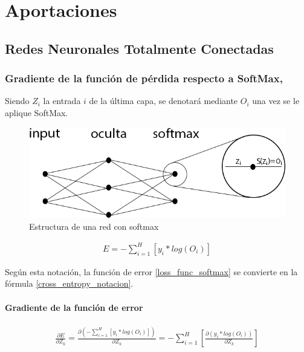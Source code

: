 \chapter{Aportaciones}

\section{Redes Neuronales Totalmente Conectadas}

\subsection{Gradiente de la función de pérdida respecto a SoftMax, \cite{Cross_entropy_backprop} \cite{Cross_entropy_backprop_grad_input}} 

Siendo $Z_i$ la entrada $i$ de la última capa, se denotará mediante $O_i$ una vez se le aplique SoftMax. \\

\begin{figure}[H]
	\centering
	\includegraphics[scale=0.4]{imagenes/NN_softmax.jpg}  
	\caption{Estructura de una red con softmax}
\end{figure}

\begin{gather}
	E = - \sum_{i=1}^{H}  [y_i * log(O_i)] 
	\label{cross_entropy_notacion}
\end{gather}

Según esta notación, la función de error \ref{loss_func_softmax} se convierte en la fórmula \ref{cross_entropy_notacion}.

\subsubsection{Gradiente de la función de error}

\begin{gather}
	\frac{\partial E}{\partial Z_k} = \frac{\partial(- \sum_{i=1}^{H}  [y_i * log(O_i)])}{\partial Z_k} = - \sum_{i=1}^{H}  [\frac{\partial(y_i * log(O_i))}{\partial Z_k}] 
\end{gather}

